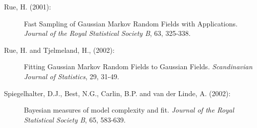 \documentclass[11pt,a4paper,twoside]{bayesxarticle}
\begin{document}
\begin{description}
\item[Rue, H. (2001):] Fast Sampling of Gaussian Markov Random Fields with Applications.
{\em Journal of the Royal Statistical Society B}, 63, 325-338.

\item[Rue, H. and Tjelmeland, H., (2002):]
Fitting Gaussian Markov Random Fields to Gaussian Fields. {\it
Scandinavian Journal of Statistics}, 29, 31-49.

\item[Spiegelhalter, D.J., Best, N.G., Carlin, B.P. and van der Linde, A. (2002):]
Bayesian measures of model complexity and fit. {\em Journal of the
Royal Statistical Society B}, 65, 583-639.

\end{description}

 

\hypertarget{index}{}
\end{document}
